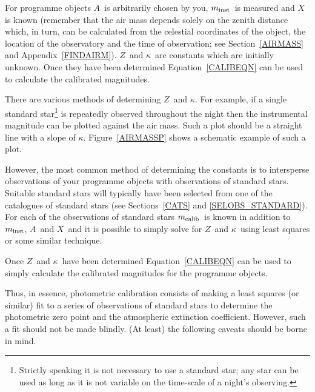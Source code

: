 \documentclass[twoside,11pt,nolof]{starlink}
\begin{document}
For programme objects $A$\, is arbitrarily chosen by you, $m_{\rm
inst}$\, is measured and $X$\, is known (remember that the air mass
depends solely on the zenith distance which, in turn, can be calculated
from the celestial coordinates of the object, the location of the
observatory and the time of observation; see Section~\ref{AIRMASS} and
Appendix~\ref{FINDAIRM}).  $Z$\, and $\kappa$\, are constants which are
initially unknown.  Once they have been determined Equation~\ref{CALIBEQN}
can be used to calculate the calibrated magnitudes.

There are various methods of determining $Z$\, and $\kappa$.  For example,
if a single standard star\footnote{Strictly speaking it is not necessary to
use a standard star; any star can be used as long as it is not variable on
the time-scale of a night's observing.} is repeatedly observed throughout
the night then the instrumental magnitude can be plotted against the air
mass.  Such a plot should be a straight line with a slope of $\kappa$.
Figure~\ref{AIRMASSP} shows a schematic example of such a plot.

However, the most common method of determining the constants is to
intersperse observations of your programme objects with observations
of standard stars.  Suitable standard stars will typically have been
selected from one of the catalogues of standard stars (see
Sections~\ref{CATS} and \ref{SELOBS_STANDARD}).  For each of the
observations of standard stars $m_{\rm calib}$\, is known in addition to
$m_{\rm inst}$, $A$\, and $X$\, and it is possible to simply solve for
$Z$\, and $\kappa$\, using least squares or some similar technique.

Once $Z$\, and $\kappa$\, have been determined Equation~\ref{CALIBEQN}
can be used to simply calculate the calibrated magnitudes for the
programme objects.

Thus, in essence, photometric calibration consists of making a least
squares (or similar) fit to a series of observations of standard stars
to determine the photometric zero point and the atmospheric extinction
coefficient.  However, such a fit should not be made blindly.  (At
least) the following caveats should be borne in mind.
\end{document}
